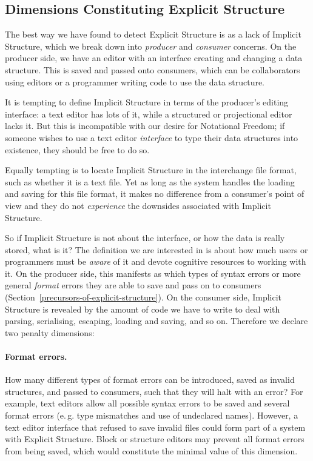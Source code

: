 \documentclass[ twoside,openright,titlepage,numbers=noenddot,headinclude,footinclude,cleardoublepage=empty,abstract=on,
                BCOR=5mm,paper=a4,fontsize=11pt
                ]{scrreprt}
\newcommand{\eg}{e.\,g.}
\theoremstyle{definition}
\begin{document}
\hypertarget{dimensions-constituting-explicit-structure}{\subsection{Dimensions Constituting Explicit
Structure}\label{dimensions-constituting-explicit-structure}}

The best way we have found to detect Explicit Structure is as a lack of
Implicit Structure, which we break down into \emph{producer} and
\emph{consumer} concerns. On the producer side, we have an editor with
an interface creating and changing a data structure. This is saved and
passed onto consumers, which can be collaborators using editors or a
programmer writing code to use the data structure.

It is tempting to define Implicit Structure in terms of the producer's
editing interface: a text editor has lots of it, while a structured or
projectional editor lacks it. But this is incompatible with our desire
for Notational Freedom; if someone wishes to use a text editor
\emph{interface} to type their data structures into existence, they
should be free to do so.

Equally tempting is to locate Implicit Structure in the interchange file
format, such as whether it is a text file. Yet as long as the system
handles the loading and saving for this file format, it makes no
difference from a consumer's point of view and they do not
\emph{experience} the downsides associated with Implicit Structure.

So if Implicit Structure is not about the interface, or how the data is
really stored, what is it? The definition we are interested in is about
how much users or programmers must be \emph{aware} of it and devote
cognitive resources to working with it. On the producer side, this
manifests as which types of syntax errors or more general \emph{format}
errors they are able to save and pass on to consumers
(Section~\ref{precursors-of-explicit-structure}). On the consumer side,
Implicit Structure is revealed by the amount of code we have to write to
deal with parsing, serialising, escaping, loading and saving, and so on.
Therefore we declare two penalty dimensions:

\paragraph{Format errors.}

How many different types of format errors can be introduced, saved as
invalid structures, and passed to consumers, such that they will halt
with an error? For example, text editors allow all possible syntax
errors to be saved and several format errors (\eg{} type mismatches and
use of undeclared names). However, a text editor interface that refused
to save invalid files could form part of a system with Explicit
Structure. Block or structure editors may prevent all format errors from
being saved, which would constitute the minimal value of this dimension.
\end{document}
